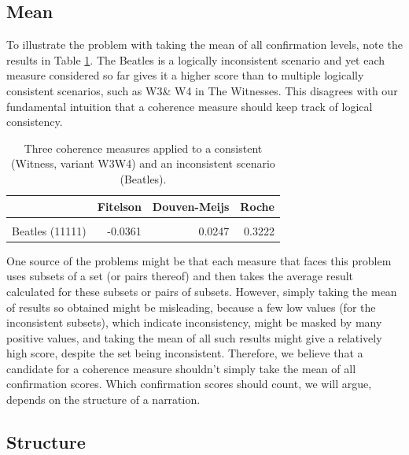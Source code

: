 \documentclass[10pt,]{scrartcl}
\begin{document}
\subsection{Mean}\label{sec:mean}


To illustrate the problem with taking the mean of all confirmation levels, note the results in Table \ref{tab:beatles}.  \textsf{The Beatles} is a logically inconsistent scenario and yet  each  measure considered so far gives it a higher score than to multiple  logically consistent scenarios, such as \textsf{W3}\& \textsf{W4} in  \textsf{The Witnesses}. This  disagrees with our fundamental
intuition that a coherence measure should keep track of logical
consistency. 



\begin{table}
\centering
\begin{tabular}{lrrr}
\toprule
  & Fitelson & Douven-Meijs & Roche\\
\midrule
\cellcolor{gray!6}{Witness W3W4 (11)} & \cellcolor{gray!6}{-0.2336} & \cellcolor{gray!6}{-0.1103} & \cellcolor{gray!6}{0.3147}\\
Beatles (11111) & -0.0361 & 0.0247 & 0.3222\\
\bottomrule
\end{tabular}
\caption{Three coherence measures applied to a consistent  (Witness, variant W3W4) and an inconsistent scenario (Beatles).}
\label{tab:beatles}
\end{table}

One source of the problems might be that each measure that faces this problem  uses subsets of a set (or pairs thereof) and then takes the average
result calculated for these subsets or pairs of subsets. However, simply
taking the mean of results so obtained might be misleading, because a
few low values (for the inconsistent subsets), which indicate
inconsistency, might be masked by many positive values, and taking the mean of all such results might give a
relatively high score, despite the set being inconsistent. Therefore, we
believe that a candidate for a coherence measure shouldn't simply take the
mean of all  confirmation scores. Which confirmation scores should count, we will argue, depends on the structure of a narration. 

\subsection{Structure}
\end{document}
